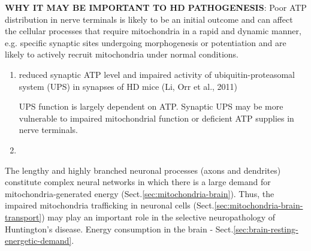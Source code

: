 
{\bf WHY IT MAY BE IMPORTANT TO HD PATHOGENESIS}: Poor ATP distribution in
nerve terminals is likely to be an initial outcome and can affect the cellular
processes that require mitochondria in a rapid and dynamic manner, e.g.
specific synaptic sites undergoing morphogenesis or potentiation and are likely
to actively recruit mitochondria under normal conditions.
\begin{enumerate}
  \item   reduced synaptic ATP level and impaired activity of
  ubiquitin-proteasomal system (UPS) in synapses of HD mice  (Li, Orr et al.,
  2011)

UPS function is largely dependent on ATP. Synaptic UPS may be more vulnerable to
impaired mitochondrial function or deficient ATP supplies in nerve terminals. 
  
  \item 
\end{enumerate}

\begin{mdframed}
The lengthy and highly branched neuronal processes (axons and dendrites)
constitute complex neural networks in which there is a large demand for
mitochondria-generated energy (Sect.\ref{sec:mitochondria-brain}). Thus, the
impaired mitochondria trafficking in neuronal cells
(Sect.\ref{sec:mitochondria-brain-transport}) may play an important role in the
selective neuropathology of Huntington's disease. Energy consumption in the
brain - Sect.\ref{sec:brain-resting-energetic-demand}.

\end{mdframed}

